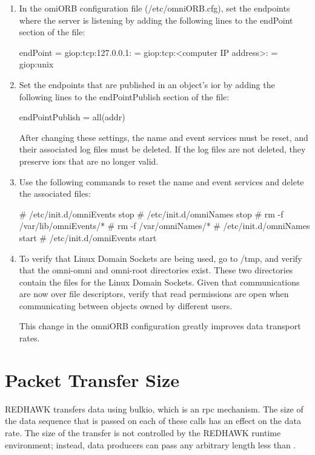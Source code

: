 \begin{enumerate}
\item In the omiORB configuration file (/etc/omniORB.cfg), set the endpoints where the server is listening by adding the following lines to the endPoint section of the file:

\begin{terminalCode}
endPoint = giop:tcp:127.0.0.1:
         = giop:tcp:<computer IP address>:
         = giop:unix
\end{terminalCode}

\item Set the endpoints that are published in an object's \ac{ior} by adding the following lines to the endPointPublish section of the file:

\begin{terminalCode}
endPointPublish = all(addr)
\end{terminalCode}

After changing these settings, the name and event services must be reset, and their associated log files must be deleted. If the log files are not deleted,  they preserve \acp{ior} that are no longer valid.

\item Use the following commands to reset the name and event services and delete the associated files:

\begin{terminalCode}
# /etc/init.d/omniEvents stop
# /etc/init.d/omniNames stop
# rm -f /var/lib/omniEvents/*
# rm -f /var/omniNames/*
# /etc/init.d/omniNames start
# /etc/init.d/omniEvents start
\end{terminalCode}

\item To verify that Linux Domain Sockets are being used, go to /tmp, and verify that the omni-omni and omni-root directories exist. These two directories contain the files for the Linux Domain Sockets. Given that communications are now over file descriptors, verify that read permissions are open when communicating between objects owned by different users.

This change in the omniORB configuration greatly improves data transport rates.
\end{enumerate}

\section{Packet Transfer Size}

REDHAWK transfers data using \ac{bulkio}, which is an \ac{rpc} mechanism. The size of the data sequence that is passed on each of these calls has an effect on the data rate. The size of the transfer is not controlled by the REDHAWK runtime environment; instead, data producers can pass any arbitrary length less than .

